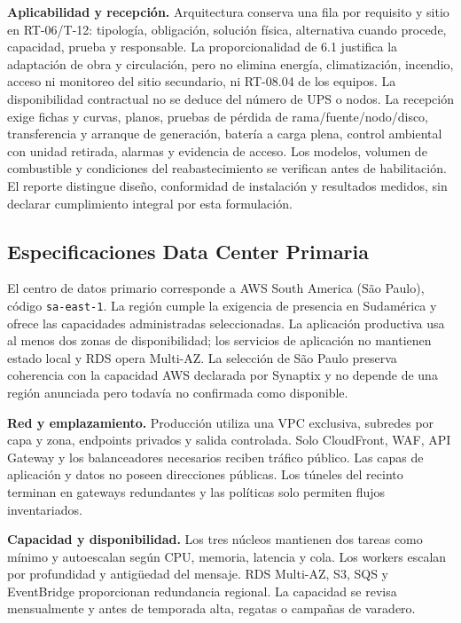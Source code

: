 \textbf{Aplicabilidad y recepción.} Arquitectura conserva una fila por requisito y sitio en RT-06/T-12: tipología, obligación, solución física, alternativa cuando procede, capacidad, prueba y responsable. La proporcionalidad de 6.1 justifica la adaptación de obra y circulación, pero no elimina energía, climatización, incendio, acceso ni monitoreo del sitio secundario, ni RT-08.04 de los equipos. La disponibilidad contractual no se deduce del número de UPS o nodos. La recepción exige fichas y curvas, planos, pruebas de pérdida de rama/fuente/nodo/disco, transferencia y arranque de generación, batería a carga plena, control ambiental con unidad retirada, alarmas y evidencia de acceso. Los modelos, volumen de combustible y condiciones del reabastecimiento se verifican antes de habilitación. El reporte distingue diseño, conformidad de instalación y resultados medidos, sin declarar cumplimiento integral por esta formulación.

\subsection{Especificaciones Data Center Primaria}

El centro de datos primario corresponde a AWS South America (São Paulo), código \texttt{sa-east-1}. La región cumple la exigencia de presencia en Sudamérica y ofrece las capacidades administradas seleccionadas. La aplicación productiva usa al menos dos zonas de disponibilidad; los servicios de aplicación no mantienen estado local y RDS opera Multi-AZ. La selección de São Paulo preserva coherencia con la capacidad AWS declarada por Synaptix y no depende de una región anunciada pero todavía no confirmada como disponible.

\textbf{Red y emplazamiento.} Producción utiliza una VPC exclusiva, subredes por capa y zona, endpoints privados y salida controlada. Solo CloudFront, WAF, API Gateway y los balanceadores necesarios reciben tráfico público. Las capas de aplicación y datos no poseen direcciones públicas. Los túneles del recinto terminan en gateways redundantes y las políticas solo permiten flujos inventariados.

\textbf{Capacidad y disponibilidad.} Los tres núcleos mantienen dos tareas como mínimo y autoescalan según CPU, memoria, latencia y cola. Los workers escalan por profundidad y antigüedad del mensaje. RDS Multi-AZ, S3, SQS y EventBridge proporcionan redundancia regional. La capacidad se revisa mensualmente y antes de temporada alta, regatas o campañas de varadero.

